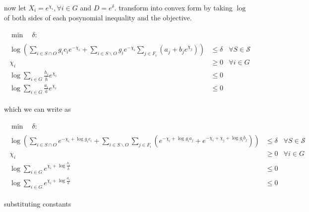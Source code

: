\documentclass[]{article}
\begin{document}
now let $X_i = e^{\chi_i}, \forall i \in G$ and $D = e^{\delta}$. transform into convex form by taking $\log$ of both sides of each posynomial inequality and the objective.

\begin{subequations}
\begin{gather}
\begin{align}
\min \quad \delta :
\end{align}
\\
\begin{align}
\log \left( \sum_{i \in S \cap O} g_i c_i e^{-\chi_i} + \sum_{i \in S \backslash O} g_i e^{-\chi_i} \sum_{j \in F_i} \left( a_j + b_j e^{\chi_j} \right) \right)
& \leq \delta
& \forall S \in \mathcal{S}
\\
\chi_i
& \geq 0
& \forall i \in G
\\
\log \sum_{i \in G} \frac{h_i}{\bar{h}} e^{\chi_i}
& \leq 0
\\
\log \sum_{i \in G} \frac{a_i}{\bar{a}} e^{\chi_i}
& \leq 0
\end{align}
\end{gather}
\end{subequations}

which we can write as

\begin{subequations}
\begin{gather}
\begin{align}
\min \quad \delta :
\end{align}
\\
\begin{align}
\log \left( \sum_{i \in S \cap O} e^{-\chi_i + \log g_i c_i} + \sum_{i \in S \backslash O} \sum_{j \in F_i} \left(  e^{-\chi_i + \log g_i a_j} + e^{-\chi_i +\chi_j + \log g_i b_j} \right) \right)
& \leq \delta
& \forall S \in \mathcal{S}
\\
\chi_i
& \geq 0
& \forall i \in G
\\
\log \sum_{i \in G} e^{\chi_i + \log \frac{h_i}{\bar{h}}}
& \leq 0
\\
\log \sum_{i \in G} e^{\chi_i + \log \frac{a_i}{\bar{a}}}
& \leq 0
\end{align}
\end{gather}
\end{subequations}

substituting constants
\end{document}
